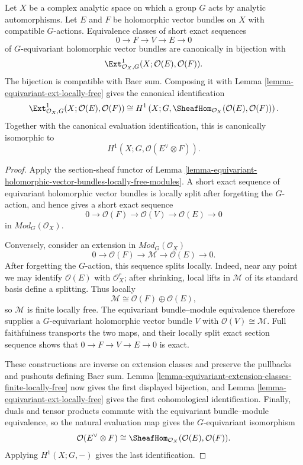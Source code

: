 \begin{lemma}
\label{lemma-equivariant-holomorphic-vector-bundle-extension-classes}
\begin{reference}
\cite[Chapter V, \S 5.6, p. 219]{Tohoku}
\end{reference}
Let $X$ be a complex analytic space on which a group $G$ acts by analytic
automorphisms. Let $E$ and $F$ be holomorphic vector bundles on $X$ with
compatible $G$-actions. Equivalence classes of short exact sequences
$$
0 \longrightarrow F \longrightarrow V \longrightarrow E \longrightarrow 0
$$
of $G$-equivariant holomorphic vector bundles are canonically in bijection
with
$$
\Ext^1_{\mathcal O_X,G}
(X;\mathcal O(E),\mathcal O(F)).
$$
The bijection is compatible with Baer sum. Composing it with Lemma
\ref{lemma-equivariant-ext-locally-free} gives the canonical identification
$$
\Ext^1_{\mathcal O_X,G}
(X;\mathcal O(E),\mathcal O(F))
\cong
H^1\left(X;G,
\SheafHom_{\mathcal O_X}(\mathcal O(E),\mathcal O(F))\right).
$$
Together with the canonical evaluation identification, this is canonically
isomorphic to
$$
H^1\left(X;G,\mathcal O(E^\vee\otimes F)\right).
$$
\end{lemma}

\begin{proof}
Apply the section-sheaf functor of Lemma
\ref{lemma-equivariant-holomorphic-vector-bundles-locally-free-modules}.
A short exact sequence of equivariant holomorphic vector bundles is locally
split after forgetting the $G$-action, and hence gives a short exact sequence
$$
0 \longrightarrow \mathcal O(F) \longrightarrow \mathcal O(V)
\longrightarrow \mathcal O(E) \longrightarrow 0
$$
in $\textit{Mod}_G(\mathcal O_X)$.

Conversely, consider an extension in $\textit{Mod}_G(\mathcal O_X)$
$$
0 \longrightarrow \mathcal O(F) \longrightarrow \mathcal M
\longrightarrow \mathcal O(E) \longrightarrow 0.
$$
After forgetting the $G$-action, this sequence splits locally. Indeed, near
any point we may identify $\mathcal O(E)$ with $\mathcal O_X^r$; after
shrinking, local lifts in $\mathcal M$ of its standard basis define a
splitting. Thus locally
$$
\mathcal M \cong \mathcal O(F)\oplus\mathcal O(E),
$$
so $\mathcal M$ is finite locally free. The equivariant bundle--module
equivalence therefore supplies a $G$-equivariant holomorphic vector bundle
$V$ with $\mathcal O(V)\cong\mathcal M$. Full faithfulness transports the
two maps, and their locally split exact section sequence shows that
$0\to F\to V\to E\to0$ is exact.

These constructions are inverse on extension classes and preserve the
pullbacks and pushouts defining Baer sum. Lemma
\ref{lemma-equivariant-extension-classes-finite-locally-free} now gives the
first displayed bijection, and Lemma
\ref{lemma-equivariant-ext-locally-free} gives the first cohomological
identification. Finally, duals and tensor products commute with the
equivariant bundle--module equivalence, so the natural evaluation map gives
the $G$-equivariant isomorphism
$$
\mathcal O(E^\vee\otimes F)
\cong
\SheafHom_{\mathcal O_X}(\mathcal O(E),\mathcal O(F)).
$$
Applying $H^1(X;G,-)$ gives the last identification.
\end{proof}
